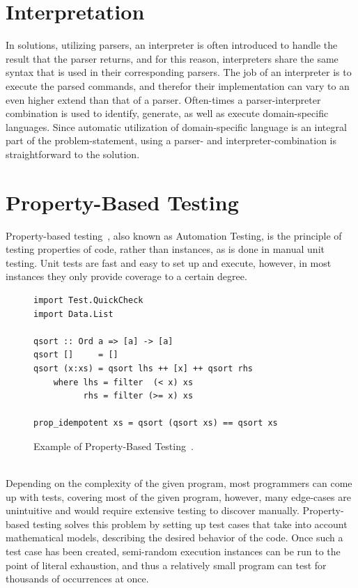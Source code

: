 \section{Interpretation}
In solutions, utilizing parsers, an interpreter is often introduced to handle the result that the parser returns, and for this reason, interpreters share the same syntax that is used in their corresponding parsers. The job of an interpreter is to execute the parsed commands, and therefor their implementation can vary to an even higher extend than that of a parser. Often-times a parser-interpreter combination is used to identify, generate, as well as execute domain-specific languages. Since automatic utilization of domain-specific language is an integral part of the problem-statement, using a parser- and interpreter-combination is straightforward to the solution.

\section{Property-Based Testing}

Property-based testing~\cite{pbt}, also known as Automation Testing, is the principle of testing properties of code, rather than instances, as is done in manual unit testing. Unit tests are fast and easy to set up and execute, however, in most instances they only provide coverage to a certain degree.

\begin{figure}[h]
  \centering
  \begin{lstlisting}
import Test.QuickCheck
import Data.List

qsort :: Ord a => [a] -> [a]
qsort []     = []
qsort (x:xs) = qsort lhs ++ [x] ++ qsort rhs
    where lhs = filter  (< x) xs
          rhs = filter (>= x) xs

prop_idempotent xs = qsort (qsort xs) == qsort xs
  \end{lstlisting}
  \caption{Example of Property-Based Testing~\cite{realWorldHaskell11}.}
  \label{fig:pbtEx}
\end{figure}\ \\

\noindent
Depending on the complexity of the given program, most programmers can come up with tests, covering most of the given program, however, many edge-cases are unintuitive and would require extensive testing to discover manually. Property-based testing solves this problem by setting up test cases that take into account mathematical models, describing the desired behavior of the code. Once such a test case has been created, semi-random execution instances can be run to the point of literal exhaustion, and thus a relatively small program can test for thousands of occurrences at once.

